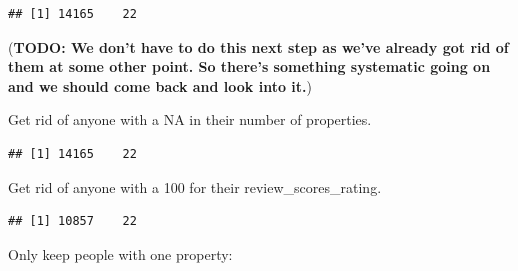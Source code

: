 \documentclass[
]{book}
\newenvironment{Shaded}{\begin{snugshade}}{\end{snugshade}}
\newcommand{\DecValTok}[1]{\textcolor[rgb]{0.00,0.00,0.81}{#1}}
\newcommand{\KeywordTok}[1]{\textcolor[rgb]{0.13,0.29,0.53}{\textbf{#1}}}
\newcommand{\NormalTok}[1]{#1}
\newcommand{\OperatorTok}[1]{\textcolor[rgb]{0.81,0.36,0.00}{\textbf{#1}}}
\newcommand{\StringTok}[1]{\textcolor[rgb]{0.31,0.60,0.02}{#1}}
\begin{document}
\begin{verbatim}
## [1] 14165    22
\end{verbatim}

(\textbf{TODO: We don't have to do this next step as we've already got rid of them at some other point. So there's something systematic going on and we should come back and look into it.})

Get rid of anyone with a NA in their number of properties.

\begin{Shaded}
\end{Shaded}

\begin{verbatim}
## [1] 14165    22
\end{verbatim}

Get rid of anyone with a 100 for their review\_scores\_rating.

\begin{Shaded}
\end{Shaded}

\begin{verbatim}
## [1] 10857    22
\end{verbatim}

Only keep people with one property:

\begin{Shaded}
\end{Shaded}
\end{document}
